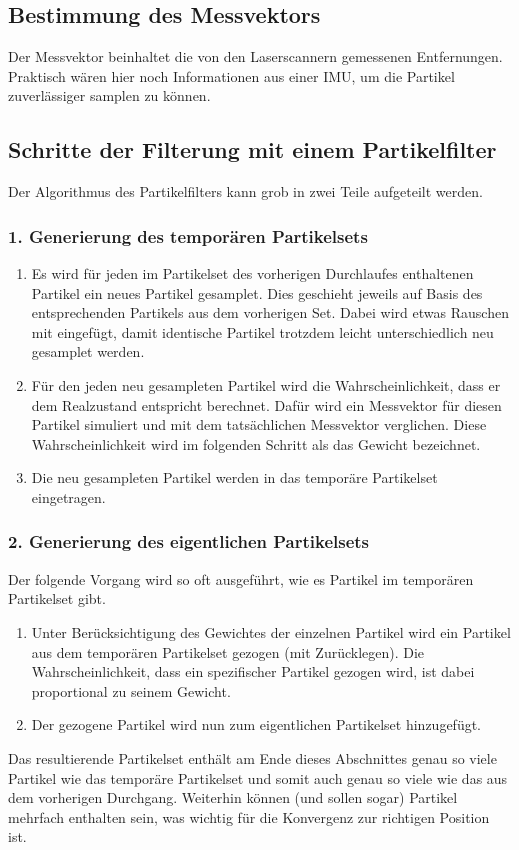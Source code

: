 \documentclass{../Vorlage/mat}
\begin{document}
\subsection*{Bestimmung des Messvektors}
Der Messvektor beinhaltet die von den Laserscannern gemessenen Entfernungen. Praktisch wären hier noch Informationen aus einer IMU, um die Partikel zuverlässiger samplen zu können.
\subsection*{Schritte der Filterung mit einem Partikelfilter}
Der Algorithmus des Partikelfilters kann grob in zwei Teile aufgeteilt werden.
\subsubsection*{1. Generierung des temporären Partikelsets}
\begin{enumerate}
	\item Es wird für jeden im Partikelset des vorherigen Durchlaufes enthaltenen Partikel ein neues Partikel gesamplet. Dies geschieht jeweils auf Basis des entsprechenden Partikels aus dem vorherigen Set. Dabei wird etwas Rauschen mit eingefügt, damit identische Partikel trotzdem leicht unterschiedlich neu gesamplet werden.
	\item Für den jeden neu gesampleten Partikel wird die Wahrscheinlichkeit, dass er dem Realzustand entspricht berechnet. Dafür wird ein Messvektor für diesen Partikel simuliert und mit dem tatsächlichen Messvektor verglichen. Diese Wahrscheinlichkeit wird im folgenden Schritt als das Gewicht bezeichnet.
	\item Die neu gesampleten Partikel werden in das temporäre Partikelset eingetragen.
\end{enumerate}
\subsubsection*{2. Generierung des eigentlichen Partikelsets}
Der folgende Vorgang wird so oft ausgeführt, wie es Partikel im temporären Partikelset gibt.
\begin{enumerate} 
	\item Unter Berücksichtigung des Gewichtes der einzelnen Partikel wird ein Partikel aus dem temporären Partikelset gezogen (mit Zurücklegen). Die Wahrscheinlichkeit, dass ein spezifischer Partikel gezogen wird, ist dabei proportional zu seinem Gewicht.
	\item Der gezogene Partikel wird nun zum eigentlichen Partikelset hinzugefügt.
\end{enumerate}
Das resultierende Partikelset enthält am Ende dieses Abschnittes genau so viele Partikel wie das temporäre Partikelset und somit auch genau so viele wie das aus dem vorherigen Durchgang. Weiterhin können (und sollen sogar) Partikel mehrfach enthalten sein, was wichtig für die Konvergenz zur richtigen Position ist.
\end{document}
